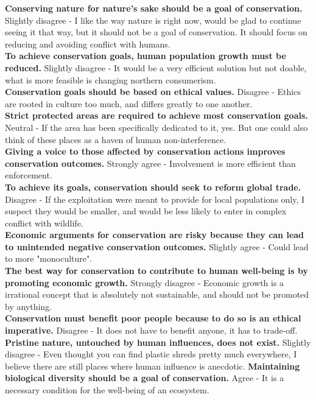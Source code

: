 \documentclass[12pt]{article}
\begin{document}
\textbf{Conserving nature for nature's sake should be a goal of conservation.} Slightly disagree - I like the way nature is right now, would be glad to continue seeing it that way, but it should not be a goal of conservation. It should focus on reducing and avoiding conflict with humans.\\
\textbf{To achieve conservation goals, human population growth must be reduced.} Slightly disagree - It would be a very efficient solution but not doable, what is more feasible is changing northern consumerism.\\
\textbf{Conservation goals should be based on ethical values.} Disagree - Ethics are rooted in culture too much, and differs greatly to one another.\\
\textbf{Strict protected areas are required to achieve most conservation goals.} Neutral - If the area has been specifically dedicated to it, yes. But one could also think of these places as a haven of human non-interference.\\
\textbf{Giving a voice to those affected by conservation actions improves conservation outcomes.} Strongly agree - Involvement is more efficient than enforcement.\\
\textbf{To achieve its goals, conservation should seek to reform global trade.} Disagree - If the exploitation were meant to provide for local populations only, I suspect they would be smaller, and would be less likely to enter in complex conflict with wildlife.\\
\textbf{Economic arguments for conservation are risky because they can lead to unintended negative conservation outcomes.} Slightly agree - Could lead to more "monoculture".\\
\textbf{The best way for conservation to contribute to human well-being is by promoting economic growth.} Strongly disagree - Economic growth is a irrational concept that is absolutely not sustainable, and should not be promoted by anything.\\
\textbf{Conservation must benefit poor people because to do so is an ethical imperative.} Disagree - It does not have to benefit anyone, it has to trade-off.\\
\textbf{Pristine nature, untouched by human influences, does not exist.} Slightly disagree - Even thought you can find plastic shreds pretty much everywhere, I believe there are still places where human influence is anecdotic.
\textbf{Maintaining biological diversity should be a goal of conservation.} Agree - It is a necessary condition for the well-being of an ecosystem.\\
\end{document}
